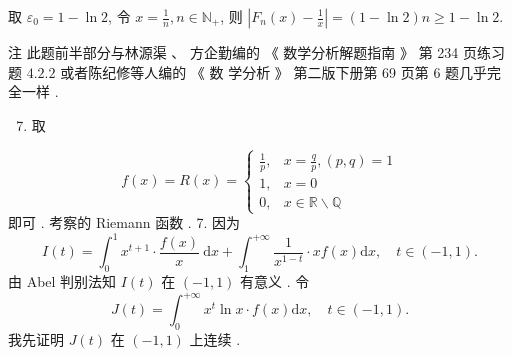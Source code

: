 \documentclass[10pt]{article}
\begin{document}
 取  $\varepsilon_{0}=1-\ln 2$,  令  $x=\frac{1}{n}, n \in \mathbb{N}_{+}$,  则  $\left|F_{n}(x)-\frac{1}{x}\right|=(1-\ln 2) n \geqslant 1-\ln 2$.

 注   此题前半部分与林源渠 、 方企勤编的 《 数学分析解题指南 》 第  234  页练习题  $4.2 .2$  或者陈纪修等人编的 《 数   学分析 》 第二版下册第  69  页第  6  题几乎完全一样 .

\begin{enumerate}
  \setcounter{enumi}{6}
  \item  取 
\end{enumerate}
$$
f(x)=R(x)= \begin{cases}\frac{1}{p}, & x=\frac{q}{p},(p, q)=1 \\ 1, & x=0 \\ 0, & x \in \mathbb{R} \backslash \mathbb{Q}\end{cases}
$$
 即可 .  考察的  Riemann  函数 . 7.  因为 
$$
I(t)=\int_{0}^{1} x^{t+1} \cdot \frac{f(x)}{x} \mathrm{~d} x+\int_{1}^{+\infty} \frac{1}{x^{1-t}} \cdot x f(x) \mathrm{d} x, \quad t \in(-1,1) .
$$
 由  Abel  判别法知  $I(t)$  在  $(-1,1)$  有意义 .  令 
$$
J(t)=\int_{0}^{+\infty} x^{t} \ln x \cdot f(x) \mathrm{d} x, \quad t \in(-1,1) .
$$
 我先证明  $J(t)$  在  $(-1,1)$  上连续 .
\end{document}
